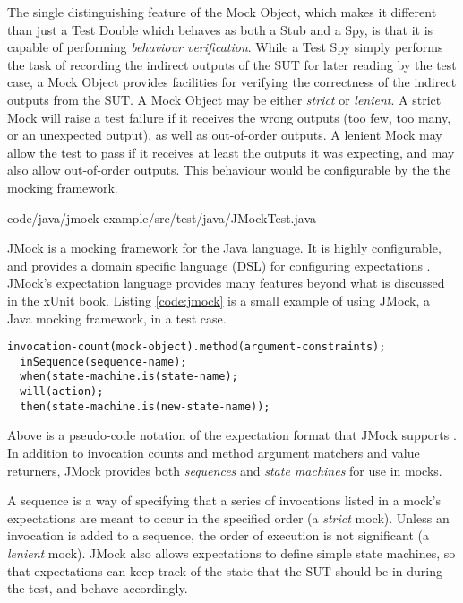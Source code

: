 The single distinguishing feature of the Mock Object, which makes it
different than just a Test Double which behaves as both a Stub and a
Spy, is that it is capable of performing \textit{behaviour
  verification}. While a Test Spy simply performs the task of recording
the indirect outputs of the SUT for later reading by the test case, a
Mock Object provides facilities for verifying the correctness of the
indirect outputs from the SUT. A Mock Object may be either
\textit{strict} or \textit{lenient}. A strict Mock will raise a test
failure if it receives the wrong outputs (too few, too many, or an
unexpected output), as well as out-of-order outputs. A lenient Mock
may allow the test to pass if it receives at least the outputs it was
expecting, and may also allow out-of-order outputs. This behaviour
would be configurable by the the mocking framework.

 {code/java/jmock-example/src/test/java/JMockTest.java}

JMock is a mocking framework for the Java language. It is highly
configurable, and provides a domain specific language (DSL) for
configuring expectations \cite{freeman:evolving}. JMock's
expectation language provides many features beyond what is discussed
in the xUnit book. Listing \ref{code:jmock} is a small example of
using JMock, a Java mocking framework, in a test case.

\footnotesize
\begin{verbatim}
invocation-count(mock-object).method(argument-constraints);
  inSequence(sequence-name);
  when(state-machine.is(state-name);
  will(action);
  then(state-machine.is(new-state-name));
\end{verbatim}
\normalsize

Above is a pseudo-code notation of the expectation format that JMock
supports \cite{freeman:growing}. In addition to invocation counts and
method argument matchers and value returners, JMock provides both
\textit{sequences} and \textit{state machines} for use in mocks.

A sequence is a way of specifying that a series of invocations listed
in a mock's expectations are meant to occur in the specified order (a
\textit{strict} mock). Unless an invocation is added to a sequence,
the order of execution is not significant (a \textit{lenient}
mock). JMock also allows expectations to define simple state machines,
so that expectations can keep track of the state that the SUT should
be in during the test, and behave accordingly.

